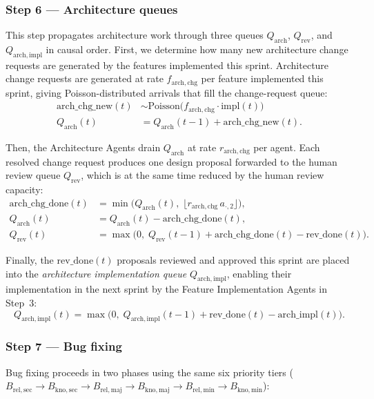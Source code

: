 \documentclass[smallextended]{svjour3}       %
\begin{document}
\subsubsection*{Step 6 --- Architecture queues}
This step propagates architecture work through three queues $Q_\mathrm{arch}$, $Q_\mathrm{rev}$, and $Q_\mathrm{arch,impl}$ in causal order. First, we determine how many new architecture change requests are generated by the features implemented this sprint.
Architecture change requests are generated at rate $f_\mathrm{arch,chg}$ per
feature implemented this sprint,
giving Poisson-distributed arrivals that fill the change-request queue:
\begin{align}
  \mathrm{arch\_chg\_new}(t) &\sim \mathrm{Poisson}\!\bigl(f_\mathrm{arch,chg}\cdot\mathrm{impl}(t)\bigr)
  \label{eq:arch_chg_new} \\
  Q_\mathrm{arch}(t) &= Q_\mathrm{arch}(t-1) + \mathrm{arch\_chg\_new}(t).
  \label{eq:Q_arch_new}
\end{align}

Then, the Architecture Agents drain $Q_\mathrm{arch}$ at rate $r_\mathrm{arch,chg}$ per agent.
Each resolved change request produces one design proposal forwarded to the human
review queue $Q_\mathrm{rev}$, which is at the same time reduced by the human review capacity:
\begin{align}
  \mathrm{arch\_chg\_done}(t) &= \min\!\bigl(Q_\mathrm{arch}(t),\;
    \lfloor r_\mathrm{arch,chg}\,a_{\cdot,2}\rfloor\bigr), \label{eq:arch_chg_done} \\
  Q_\mathrm{arch}(t) &= Q_\mathrm{arch}(t) - \mathrm{arch\_chg\_done}(t),
    \label{eq:Q_arch} \\
  Q_\mathrm{rev}(t) &= \max\!\bigl(0,\;
    Q_\mathrm{rev}(t-1) + \mathrm{arch\_chg\_done}(t) - \mathrm{rev\_done}(t)\bigr).
    \label{eq:Q_rev}
\end{align}

Finally, the $\mathrm{rev\_done}(t)$ proposals reviewed and approved this sprint are placed
into the \emph{architecture implementation queue} $Q_\mathrm{arch,impl}$, enabling their implementation in the next sprint by the Feature Implementation Agents in Step~3:
\begin{equation}
  Q_\mathrm{arch,impl}(t) = \max\!\bigl(0,\;
    Q_\mathrm{arch,impl}(t-1) + \mathrm{rev\_done}(t) - \mathrm{arch\_impl}(t)\bigr).
  \label{eq:Q_arch_impl}
\end{equation}

\subsubsection*{Step 7 --- Bug fixing}
Bug fixing proceeds in two phases using the same six priority tiers
($B_\mathrm{rel,sec} \to B_\mathrm{kno,sec} \to B_\mathrm{rel,maj} \to
B_\mathrm{kno,maj} \to B_\mathrm{rel,min} \to B_\mathrm{kno,min}$):
\end{document}
